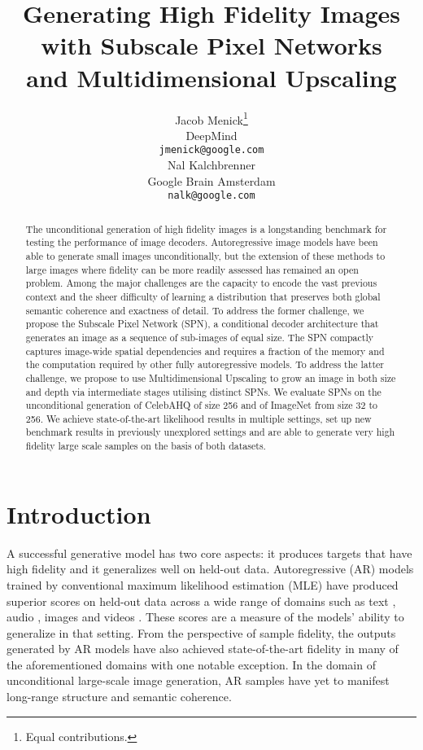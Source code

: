 \documentclass{article} \usepackage{iclr2019_conference,times}
\title{Generating High Fidelity Images \\ with Subscale Pixel Networks \\ and Multidimensional Upscaling}
\author{Jacob Menick\thanks{Equal contributions.} \\
DeepMind\\
\texttt{jmenick@google.com} \\
\And
Nal Kalchbrenner \\
Google Brain Amsterdam \\
\texttt{nalk@google.com} \\
}
\begin{document}
\maketitle

\begin{abstract}

The unconditional generation of high fidelity images is a longstanding benchmark
for testing the performance of image decoders. Autoregressive image models
have been able to generate small images unconditionally, but the extension of
these methods to large images where fidelity can be more readily assessed has
remained an open problem. Among the major challenges are the capacity to
encode the vast previous context and the
sheer difficulty of learning a distribution that preserves
both global semantic coherence and exactness of detail. To address the former
challenge, we propose the Subscale Pixel Network (SPN), a conditional decoder
architecture that generates an image as a sequence of sub-images of equal size. The SPN compactly captures
image-wide spatial dependencies and requires a fraction of the memory and the
computation required by other fully autoregressive models. To address the latter challenge, we propose to use Multidimensional Upscaling to grow an image in both size and depth via intermediate stages utilising distinct SPNs. We
evaluate SPNs on the unconditional generation of CelebAHQ of size 256 and of ImageNet
from size 32 to 256. We achieve state-of-the-art likelihood results in multiple
settings, set up new benchmark results in previously unexplored settings and are
able to generate very high fidelity large scale samples on the basis of both datasets.


\end{abstract}

\section{Introduction}

A successful generative model has two core aspects: it produces targets that have high fidelity and it generalizes well on held-out data. Autoregressive (AR) models trained by conventional maximum likelihood estimation (MLE) have produced superior scores on held-out data across a wide range of domains such as text \citep{Vaswani17,gnmt}, audio \citep{Oord16}, images \citep{Parmar18} and videos \citep{vpn}. These scores are a measure of the models' ability to generalize in that setting. From the perspective of sample fidelity, the outputs generated by AR models have also achieved state-of-the-art fidelity in many of the aforementioned domains with one notable exception. In the domain of unconditional large-scale image generation, AR samples have yet to manifest long-range structure and semantic coherence.
\end{document}

